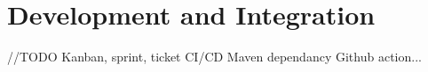\section{Development and Integration}

//TODO Kanban, sprint, ticket
CI/CD
Maven dependancy
Github action...